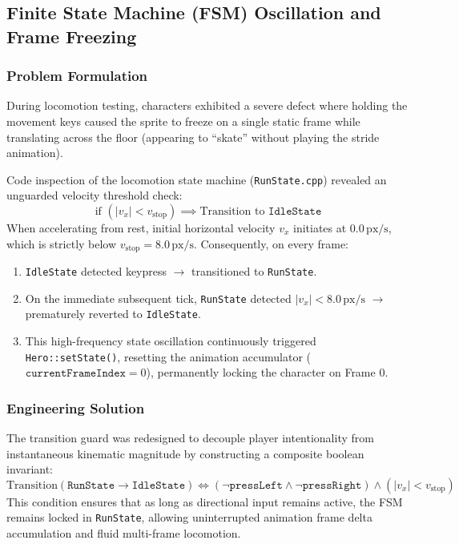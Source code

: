 \subsection{Finite State Machine (FSM) Oscillation and Frame Freezing}
\label{subsec:fsm_oscillation}

\subsubsection{Problem Formulation}
During locomotion testing, characters exhibited a severe defect where holding the movement keys caused the sprite to freeze on a single static frame while translating across the floor (appearing to ``skate'' without playing the stride animation).

Code inspection of the locomotion state machine (\texttt{RunState.cpp}) revealed an unguarded velocity threshold check:
\begin{equation}
    \text{if } (|v_x| < v_{\text{stop}}) \implies \text{Transition to } \mathtt{IdleState}
\end{equation}
When accelerating from rest, initial horizontal velocity $v_x$ initiates at $0.0\,\text{px/s}$, which is strictly below $v_{\text{stop}} = 8.0\,\text{px/s}$. Consequently, on every frame:
\begin{enumerate}
    \item \texttt{IdleState} detected keypress $\rightarrow$ transitioned to \texttt{RunState}.
    \item On the immediate subsequent tick, \texttt{RunState} detected $|v_x| < 8.0\,\text{px/s}$ $\rightarrow$ prematurely reverted to \texttt{IdleState}.
    \item This high-frequency state oscillation continuously triggered \texttt{Hero::setState()}, resetting the animation accumulator ($\mathtt{currentFrameIndex} = 0$), permanently locking the character on Frame 0.
\end{enumerate}

\subsubsection{Engineering Solution}
The transition guard was redesigned to decouple player intentionality from instantaneous kinematic magnitude by constructing a composite boolean invariant:
\begin{equation}
    \text{Transition}(\mathtt{RunState} \rightarrow \mathtt{IdleState}) \iff \left( \neg \mathtt{pressLeft} \land \neg \mathtt{pressRight} \right) \land \left( |v_x| < v_{\text{stop}} \right)
\end{equation}
This condition ensures that as long as directional input remains active, the FSM remains locked in \texttt{RunState}, allowing uninterrupted animation frame delta accumulation and fluid multi-frame locomotion.


